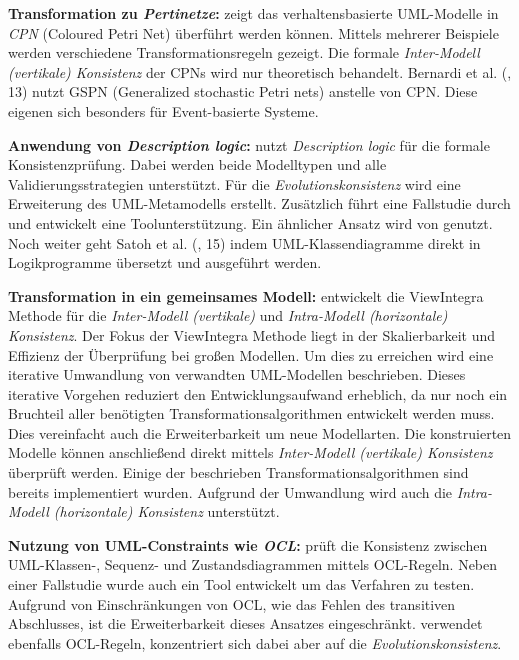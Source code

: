 \textbf{Transformation zu \emph{Pertinetze}:}
\cite{Shinkawa2006} zeigt das verhaltensbasierte UML-Modelle in \emph{CPN} (Coloured Petri Net) überführt werden können.
Mittels mehrerer Beispiele werden verschiedene Transformationsregeln gezeigt.
Die formale \emph{Inter-Modell (vertikale) Konsistenz} der CPNs wird nur theoretisch behandelt.
Bernardi et al. (\cite{Usman2008}, 13) nutzt GSPN (Generalized stochastic Petri nets) anstelle von CPN.
Diese eigenen sich besonders für Event-basierte Systeme.

\textbf{Anwendung von \emph{Description logic}:}
\cite{Mens2005} nutzt \emph{Description logic} für die formale Konsistenzprüfung.
Dabei werden beide Modelltypen und alle Validierungsstrategien unterstützt.
Für die \emph{Evolutionskonsistenz} wird eine Erweiterung des UML-Metamodells erstellt.
Zusätzlich führt \cite{Mens2005} eine Fallstudie durch und entwickelt eine Toolunterstützung.
Ein ähnlicher Ansatz wird von \cite{Simmonds2004} genutzt.
Noch weiter geht Satoh et al. (\cite{Usman2008}, 15) indem UML-Klassendiagramme direkt in Logikprogramme übersetzt und ausgeführt werden.

\textbf{Transformation in ein gemeinsames Modell:}
\cite{Egyed2001} entwickelt die ViewIntegra Methode für die  \emph{Inter-Modell (vertikale)} und \emph{Intra-Modell (horizontale) Konsistenz}.
Der Fokus der ViewIntegra Methode liegt in der Skalierbarkeit und Effizienz der Überprüfung bei großen Modellen.
Um dies zu erreichen wird eine iterative Umwandlung von verwandten UML-Modellen beschrieben.
Dieses iterative Vorgehen reduziert den Entwicklungsaufwand erheblich, da nur noch ein Bruchteil aller benötigten Transformationsalgorithmen entwickelt werden muss.
Dies vereinfacht auch die Erweiterbarkeit um neue Modellarten.
Die konstruierten Modelle können anschließend direkt mittels \emph{Inter-Modell (vertikale) Konsistenz} überprüft werden.
Einige der beschrieben Transformationsalgorithmen sind bereits implementiert wurden.
Aufgrund der Umwandlung wird auch die \emph{Intra-Modell (horizontale) Konsistenz} unterstützt.

\textbf{Nutzung von UML-Constraints wie \emph{OCL}:}
\cite{Egyed2006} prüft die Konsistenz zwischen UML-Klassen-, Sequenz- und Zustandsdiagrammen mittels OCL-Regeln.
Neben einer Fallstudie wurde auch ein Tool entwickelt um das Verfahren zu testen.
Aufgrund von Einschränkungen von OCL, wie das Fehlen des transitiven Abschlusses, ist die Erweiterbarkeit dieses Ansatzes eingeschränkt.
\cite{Briand2003} verwendet ebenfalls OCL-Regeln, konzentriert sich dabei aber auf die \emph{Evolutionskonsistenz}.

